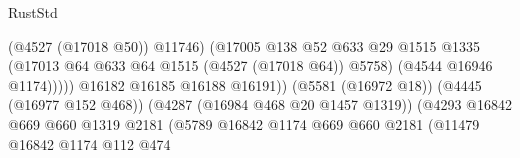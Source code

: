 \begin{lexlean}{RustStd}
\begin{coremodule}
                                                            (@4527 (@17018 @50))
                                                            @11746)
                                                          (@17005
                                                            @138
                                                            @52
                                                            @633
                                                            @29
                                                            @1515
                                                            @1335
                                                            (@17013
                                                              @64
                                                              @633
                                                              @64
                                                              @1515
                                                              (@4527 (@17018 @64))
                                                              @5758)
                                                            (@4544 @16946 @1174)))))
                                                    @16182
                                                    @16185
                                                    @16188
                                                    @16191))
                                                (@5581 (@16972 @18))
                                                (@4445 (@16977 @152 @468))
                                                (@4287 (@16984 @468 @20 @1457 @1319))
                                                (@4293
                                                  @16842
                                                  @669
                                                  @660
                                                  @1319
                                                  @2181
                                                  (@5789
                                                    @16842
                                                    @1174
                                                    @669
                                                    @660
                                                    @2181
                                                    (@11479
                                                      @16842
                                                      @1174
                                                      @112
                                                      @474

\end{coremodule}
\end{lexlean}
